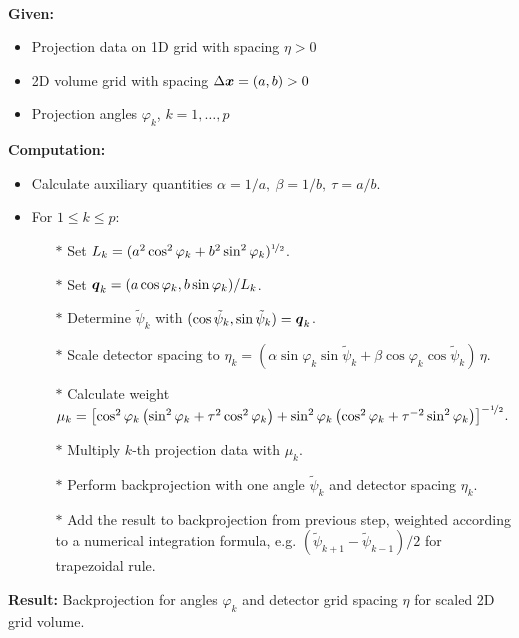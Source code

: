 \documentclass{amsart}
\renewcommand*{\phi}{\varphi}
\begin{document}
\begin{algorithm}~\\[2ex]
 \textbf{Given:}
 \begin{itemize}
  \item Projection data on 1D grid with spacing $\eta > 0$
  \item 2D volume grid with spacing $\Delta{\boldsymbol{x}} = (a, b) > 0$
  \item Projection angles $\phi_k$, $k = 1, \ldots, p$
 \end{itemize}
 \vspace*{2ex}
 \textbf{Computation:}
 \begin{itemize}
  \item Calculate auxiliary quantities $\alpha = 1 / a,\ \beta = 1 / b,\ \tau = a / b$.
  \item For $1 \leq k \leq p$:
  \begin{itemize}
   \item[$\ast$] Set $L_k = (a^2 \cos^2\phi_k + b^2 \sin^2\phi_k)^{\nfhalf}$.
   \item[$\ast$] Set $\Bq_k = (a \cos\phi_k, b \sin\phi_k) / L_k$.
   \item[$\ast$] Determine $\tilde\psi_k$ with $(\cos\tilde\psi_k, \sin\tilde\psi_k) = {\boldsymbol{q}}_k$.
   \item[$\ast$] Scale detector spacing to $\eta_k = (\alpha \sin\phi_k \sin\tilde\psi_k + \beta \cos\phi_k \cos\tilde\psi_k)\, \eta$.
   \item[$\ast$] Calculate weight $\mu_k = \left[\cos^2\phi_k \left(\sin^2\phi_k + \tau^2 \cos^2\phi_k\right) +
   \sin^2\phi_k \left(\cos^2\phi_k + \tau^{-2} \sin^2\phi_k\right)\right]^{-\nfhalf}$.
   \item[$\ast$] Multiply $k$-th projection data with $\mu_k$.
   \item[$\ast$] Perform backprojection with one angle $\tilde\psi_k$ and detector spacing $\eta_k$.
   \item[$\ast$] Add the result to backprojection from previous step, weighted according to a numerical integration formula, e.g. 
   $(\tilde\psi_{k+1} - \tilde\psi_{k-1}) / 2$ for trapezoidal rule.
  \end{itemize}
 \end{itemize}
 \vspace*{2ex}
 \textbf{Result:} Backprojection for angles $\phi_k$ and detector grid spacing $\eta$ for scaled 2D grid volume.
\end{algorithm}
\end{document}

